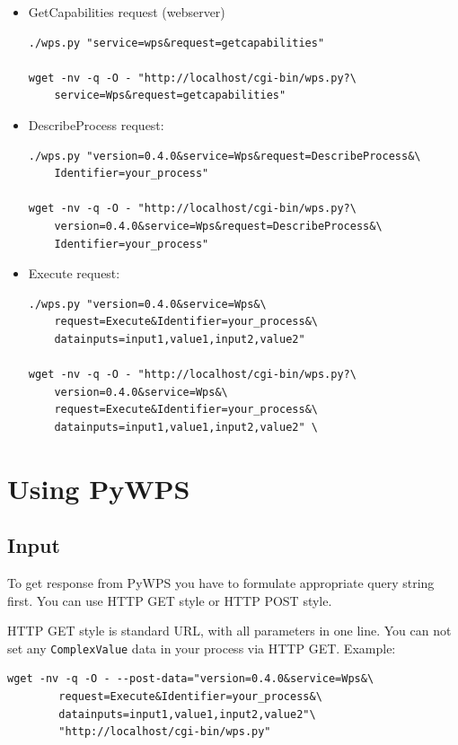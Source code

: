 \documentclass[a4paper,11pt]{article}
\begin{document}
\begin{itemize}
    \item GetCapabilities request (webserver)
\begin{verbatim}
./wps.py "service=wps&request=getcapabilities"

wget -nv -q -O - "http://localhost/cgi-bin/wps.py?\
    service=Wps&request=getcapabilities"
\end{verbatim}
        
    \item DescribeProcess request:
\begin{verbatim}
./wps.py "version=0.4.0&service=Wps&request=DescribeProcess&\
    Identifier=your_process"

wget -nv -q -O - "http://localhost/cgi-bin/wps.py?\
    version=0.4.0&service=Wps&request=DescribeProcess&\
    Identifier=your_process"
\end{verbatim}
        
    \item Execute request:
\begin{verbatim}
./wps.py "version=0.4.0&service=Wps&\
    request=Execute&Identifier=your_process&\
    datainputs=input1,value1,input2,value2"

wget -nv -q -O - "http://localhost/cgi-bin/wps.py?\
    version=0.4.0&service=Wps&\
    request=Execute&Identifier=your_process&\
    datainputs=input1,value1,input2,value2" \
\end{verbatim}
        
\end{itemize}


\section{Using PyWPS}
\subsection{Input}
    
To get response from PyWPS you have to formulate appropriate query string first. You can use HTTP GET style or HTTP POST style.
    
    
HTTP GET style is standard URL, with all parameters in one line. You can not set any \texttt{ComplexValue} data in your process via HTTP GET. Example:
    
\begin{verbatim}
wget -nv -q -O - --post-data="version=0.4.0&service=Wps&\
        request=Execute&Identifier=your_process&\
        datainputs=input1,value1,input2,value2"\
        "http://localhost/cgi-bin/wps.py"
\end{verbatim}
    
\end{document}

